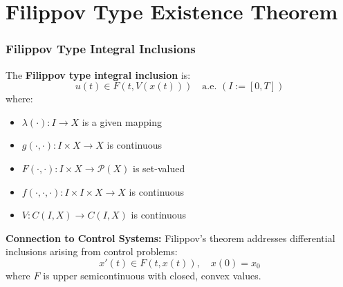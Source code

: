 \documentclass[aspectratio=169,10pt]{beamer}
\begin{document}

\section{Filippov Type Existence Theorem}

\begin{frame}
\frametitle{Filippov Type Integral Inclusions}

\begin{definition}
The \textbf{Filippov type integral inclusion} is:
\[
u(t) \in F(t, V(x(t))) \quad \text{a.e. } (I := [0,T])
\]
where:
\begin{itemize}
    \item $\lambda(\cdot): I \to X$ is a given mapping
    \item $g(\cdot, \cdot): I \times X \to X$ is continuous
    \item $F(\cdot, \cdot): I \times X \to \mathcal{P}(X)$ is set-valued
    \item $f(\cdot, \cdot, \cdot): I \times I \times X \to X$ is continuous
    \item $V: C(I,X) \to C(I,X)$ is continuous
\end{itemize}
\end{definition}

\vspace{0.5cm}

\textbf{Connection to Control Systems:}
Filippov's theorem addresses differential inclusions arising from control problems:
\[
x'(t) \in F(t, x(t)), \quad x(0) = x_0
\]
where $F$ is upper semicontinuous with closed, convex values.

\end{frame}
\end{document}
